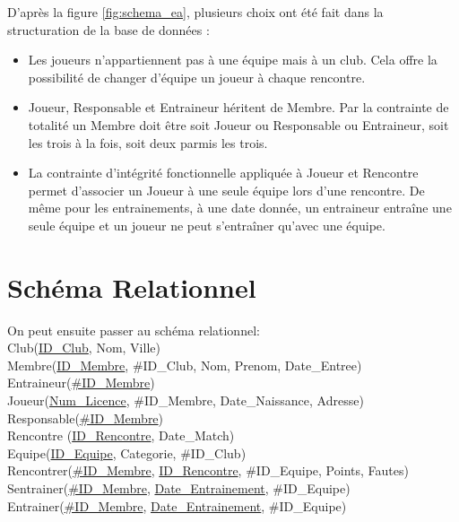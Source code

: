 \documentclass[a4paper»,8pt,french,fleqn]{report}
\begin{document}
D'après la figure \ref{fig:schema_ea}, plusieurs choix ont été fait dans la structuration de la base de données : \\

\begin{itemize}

\item Les joueurs n'appartiennent pas à une équipe mais à un club. Cela offre la possibilité de changer d'équipe un joueur à chaque rencontre. \\

\item Joueur, Responsable et Entraineur héritent de Membre. Par la contrainte de totalité un Membre doit être soit Joueur ou Responsable ou Entraineur, soit les trois à la fois, soit deux parmis les trois. \\

\item La contrainte d'intégrité fonctionnelle appliquée à Joueur et Rencontre permet d'associer un Joueur à une seule équipe lors d'une rencontre. De même pour les entrainements, à une date donnée, un entraineur entraîne une seule équipe et un joueur ne peut s'entraîner qu'avec une équipe.

\end{itemize}

\section{Schéma Relationnel}

On peut ensuite passer au schéma relationnel: \\
Club(\underline{ID\_Club}, Nom, Ville) \\ 
Membre(\underline{ID\_Membre}, \#ID\_Club, Nom, Prenom, Date\_Entree) \\
Entraineur(\underline{\#ID\_Membre}) \\
Joueur(\underline{Num\_Licence}, \#ID\_Membre, Date\_Naissance, Adresse) \\ 
Responsable(\underline{\#ID\_Membre}) \\
Rencontre (\underline{ID\_Rencontre}, Date\_Match) \\
Equipe(\underline{ID\_Equipe}, Categorie, \#ID\_Club) \\
Rencontrer(\underline{\#ID\_Membre}, \underline{ID\_Rencontre}, \#ID\_Equipe, Points, Fautes) \\
Sentrainer(\underline{\#ID\_Membre}, \underline{Date\_Entrainement}, \#ID\_Equipe) \\
Entrainer(\underline{\#ID\_Membre}, \underline{Date\_Entrainement}, \#ID\_Equipe) 
\end{document}
